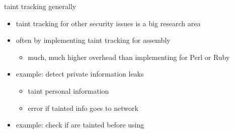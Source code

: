 
\begin{frame}{taint tracking generally}
    \begin{itemize}
    \item taint tracking for other security issues is a big research area
    \item often by implementing taint tracking for assembly
        \begin{itemize}
        \item much, much higher overhead than implementing for Perl or Ruby
        \end{itemize}
   \item<2->example: detect private information leaks
        \begin{itemize}
        \item taint personal information
        \item error if tainted info goes to network
        \end{itemize}
    \item<2-> example: check if  are tainted before using
    \end{itemize}
\end{frame}
